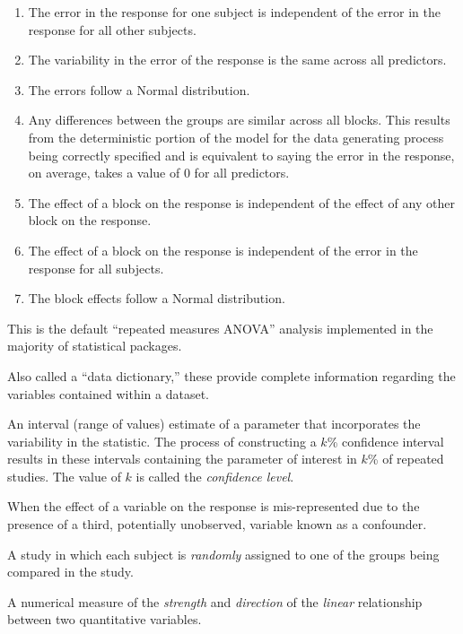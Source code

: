 \documentclass[
  letterpaper,
  DIV=11,
  numbers=noendperiod]{scrreprt}
\providecommand{\tightlist}{%
  \setlength{\itemsep}{0pt}\setlength{\parskip}{0pt}}\usepackage{longtable,booktabs,array}
\theoremstyle{definition}
\theoremstyle{definition}
\theoremstyle{plain}
\theoremstyle{remark}
\begin{document}
\begin{enumerate}
\def\labelenumi{\arabic{enumi}.}
\tightlist
\item
  The error in the response for one subject is independent of the error
  in the response for all other subjects.
\item
  The variability in the error of the response is the same across all
  predictors.
\item
  The errors follow a Normal distribution.
\item
  Any differences between the groups are similar across all blocks. This
  results from the deterministic portion of the model for the data
  generating process being correctly specified and is equivalent to
  saying the error in the response, on average, takes a value of 0 for
  all predictors.
\item
  The effect of a block on the response is independent of the effect of
  any other block on the response.
\item
  The effect of a block on the response is independent of the error in
  the response for all subjects.
\item
  The block effects follow a Normal distribution.
\end{enumerate}

This is the default ``repeated measures ANOVA'' analysis implemented in
the majority of statistical packages.

\begin{description}
\tightlist
\item[Codebook (Definition~\ref{def-codebook})]
Also called a ``data dictionary,'' these provide complete information
regarding the variables contained within a dataset.
\item[Confidence Interval (Definition~\ref{def-confidence-interval})]
An interval (range of values) estimate of a parameter that incorporates
the variability in the statistic. The process of constructing a \(k\)\%
confidence interval results in these intervals containing the parameter
of interest in \(k\)\% of repeated studies. The value of \(k\) is called
the \emph{confidence level}.
\item[Confounding (Definition~\ref{def-confounding})]
When the effect of a variable on the response is mis-represented due to
the presence of a third, potentially unobserved, variable known as a
confounder.
\item[Controlled Experiment
(Definition~\ref{def-controlled-experiment})]
A study in which each subject is \emph{randomly} assigned to one of the
groups being compared in the study.
\item[Correlation Coefficient
(Definition~\ref{def-correlation-coefficient})]
A numerical measure of the \emph{strength} and \emph{direction} of the
\emph{linear} relationship between two quantitative variables.
\end{description}
\end{document}
